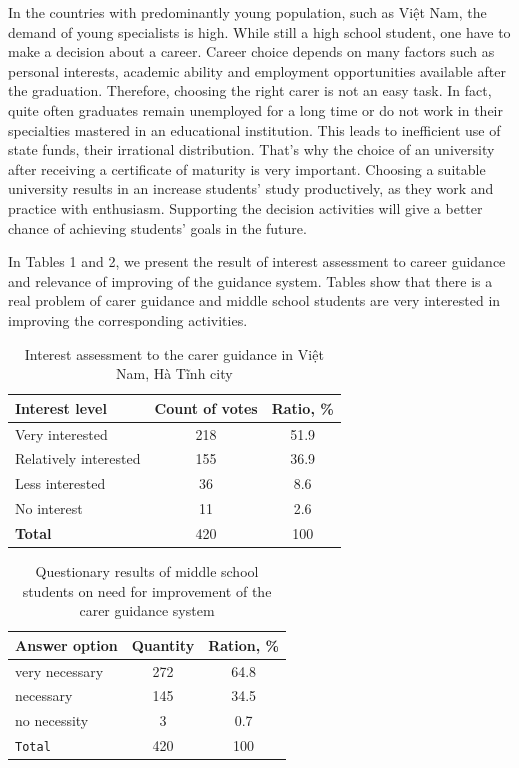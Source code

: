\documentclass[conference,a4]{IEEEtran}
\begin{document}
In the countries with predominantly young population, such as Việt Nam, the demand of young specialists is high.  While still a high school student, one have to make a decision about a career. Career choice depends on many factors such as personal interests, academic ability and employment opportunities available after the graduation.  Therefore, choosing the right carer is not an easy task.  In fact, quite often graduates remain unemployed for a long time or do not work in their specialties mastered in an educational institution.  This leads to inefficient use of state funds, their irrational distribution.  That's why the choice of an university after receiving a certificate of maturity is very important.  Choosing a suitable university results in an increase students' study productively, as they work and practice with enthusiasm.  Supporting the decision activities will give a better chance of achieving students' goals in the future.

In Tables 1 and 2, we present the result of interest assessment to career guidance and relevance of improving of the guidance system.  Tables show that there is a real problem of carer guidance and middle school students are very interested in improving the corresponding activities.
\begin{table}[thb]
  \caption{Interest assessment to the carer guidance in Việt Nam, Hà Tĩnh city}
  \label{tab:interest}
  \centering
  \begin{tabular}{|l|c|c|}
    \hline
    \textbf{Interest level} & \textbf{Count of votes} & \textbf{Ratio, \%} \\
    \hline
    Very interested & 218 & 51.9 \\
    \hline
    Relatively interested & 155 & 36.9 \\
    \hline
    Less interested & 36 & 8.6 \\
    \hline
    No interest & 11 & 2.6 \\
    \textbf{Total} & 420 & 100 \\
    \hline
  \end{tabular}
\end{table}

\begin{table}[bht]
  \caption{Questionary results of middle school students on need for improvement of the carer guidance system}
  \label{tab:interest}
  \centering
  \begin{tabular}{|l|c|c|}
    \hline
    \textbf{Answer option} & \textbf{Quantity} & \textbf{Ration, \%} \\
    \hline
    very necessary & 272 & 64.8 \\
    \hline
    necessary & 145 & 34.5 \\
    \hline
    no necessity & 3 & 0.7 \\
    \hline
    \texttt{Total} & 420 & 100 \\
    \hline
  \end{tabular}
\end{table}
\end{document}
